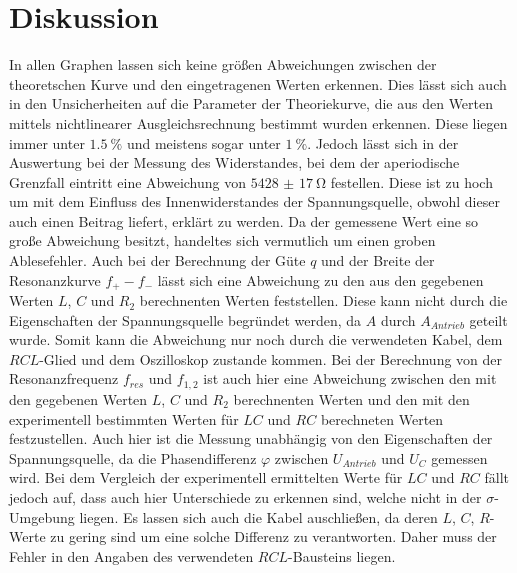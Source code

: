 \section{Diskussion}
\label{sec:Diskussion}



In allen Graphen lassen sich keine größen Abweichungen zwischen der theoretschen Kurve und den eingetragenen Werten erkennen. Dies lässt sich auch in den Unsicherheiten auf die Parameter der Theoriekurve, die aus den Werten mittels nichtlinearer Ausgleichsrechnung bestimmt wurden erkennen. Diese liegen immer unter $\SI{1.5}{\percent}$ und meistens sogar unter $\SI{1}{\percent}$. Jedoch lässt sich in der Auswertung bei der Messung des Widerstandes, bei dem der aperiodische Grenzfall eintritt eine Abweichung von $\SI{5428(17)}{\ohm}$ festellen. Diese ist zu hoch um mit dem Einfluss des Innenwiderstandes der Spannungsquelle, obwohl dieser auch einen Beitrag liefert, erklärt zu werden. Da der gemessene Wert eine so große Abweichung besitzt, handeltes sich vermutlich um einen groben Ablesefehler. Auch bei der Berechnung der Güte $q$ und der Breite der Resonanzkurve $f_+ - f_-$ lässt sich eine Abweichung zu den aus den gegebenen Werten $L$, $C$ und $R_2$ berechnenten Werten feststellen. Diese kann nicht durch die Eigenschaften der Spannungsquelle begründet werden, da $A$ durch $A_{Antrieb}$ geteilt wurde. Somit kann die Abweichung nur noch durch die verwendeten Kabel, dem $RCL$-Glied und dem Oszilloskop zustande kommen. Bei der Berechnung von der Resonanzfrequenz $f_{res}$ und $f_{1,2}$ ist auch hier eine Abweichung zwischen den mit den gegebenen Werten $L$, $C$ und $R_2$ berechnenten Werten und den mit den experimentell bestimmten Werten für $LC$ und $RC$ berechneten Werten festzustellen. Auch hier ist die Messung unabhängig von den Eigenschaften der Spannungsquelle, da die Phasendifferenz $\varphi$ zwischen $U_{Antrieb}$ und $U_C$ gemessen wird. Bei dem Vergleich der experimentell ermittelten Werte für $LC$ und $RC$ fällt jedoch auf, dass auch hier Unterschiede zu erkennen sind, welche nicht in der $\sigma$-Umgebung liegen. Es lassen sich auch die Kabel 
auschließen, da deren $L$, $C$, $R$-Werte zu gering sind um eine solche Differenz zu verantworten. Daher muss der Fehler in den Angaben des verwendeten $RCL$-Bausteins liegen. 







	
